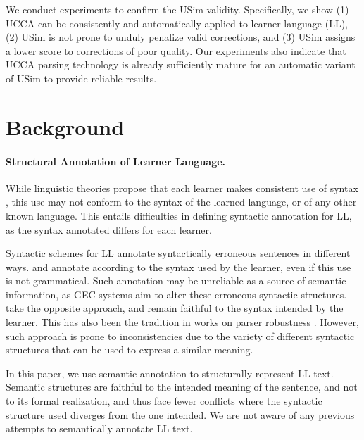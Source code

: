 \documentclass[a4paper, 11pt]{article}
\begin{document}
We conduct experiments to confirm the {\sc USim} validity.
Specifically, we show
(1) UCCA can be consistently and automatically applied to learner language (LL), 
(2) {\sc USim} is not prone to unduly penalize valid corrections, and 
(3) {\sc USim} assigns a lower score to corrections of poor quality.
Our experiments also indicate that UCCA parsing technology is already sufficiently mature for an automatic variant of {\sc USim} to provide reliable results.
\vspace{-.6cm}

\section{Background}
\vspace{-.3cm}
\paragraph{Structural Annotation of Learner Language.}
While linguistic theories propose that each learner makes consistent use of syntax 
\cite{huebner1985system,tarone1983variability}, this use may not conform to the syntax of the learned language, 
or of any other known language. This entails difficulties in defining syntactic annotation for LL, as the syntax annotated differs for each learner.

Syntactic schemes for LL annotate syntactically erroneous sentences in different ways.
 and  annotate according 
to the syntax used by the learner, even if this use is not grammatical.
Such annotation may be unreliable as a source of semantic information, 
as GEC systems aim to alter these erroneous syntactic structures.
 take the opposite approach, and remain faithful to the syntax intended by the learner.
This has also been the tradition in works on parser robustness 
\cite{bigert2005unsupervised,foster2004parsing}. However, such approach is prone to inconsistencies due to the 
variety of different syntactic structures that can be used to express a similar meaning. 

In this paper, we use semantic annotation to structurally
represent LL text. Semantic structures are faithful to the intended
meaning of the sentence, and not to its formal realization, and thus face
fewer conflicts where the syntactic structure used diverges from
the one intended. We are not aware of any previous attempts to semantically
annotate LL text.
\end{document}
